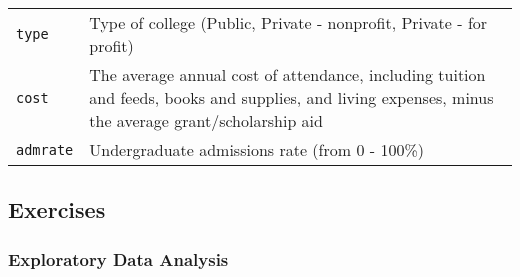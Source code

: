 \documentclass[]{book}
\begin{document}
\begin{longtable}[]{@{}ll@{}}
\toprule
\begin{minipage}[t]{0.16\columnwidth}\raggedright\strut
\texttt{type}\strut
\end{minipage} & \begin{minipage}[t]{0.56\columnwidth}\raggedright\strut
Type of college (Public, Private - nonprofit, Private - for
profit)\strut
\end{minipage}\tabularnewline
\begin{minipage}[t]{0.16\columnwidth}\raggedright\strut
\texttt{cost}\strut
\end{minipage} & \begin{minipage}[t]{0.56\columnwidth}\raggedright\strut
The average annual cost of attendance, including tuition and feeds,
books and supplies, and living expenses, minus the average
grant/scholarship aid\strut
\end{minipage}\tabularnewline
\begin{minipage}[t]{0.16\columnwidth}\raggedright\strut
\texttt{admrate}\strut
\end{minipage} & \begin{minipage}[t]{0.56\columnwidth}\raggedright\strut
Undergraduate admissions rate (from 0 - 100\%)\strut
\end{minipage}\tabularnewline
\bottomrule
\end{longtable}

\subsection{Exercises}\label{exercises}

\subsubsection{Exploratory Data
Analysis}\label{exploratory-data-analysis}
\end{document}
